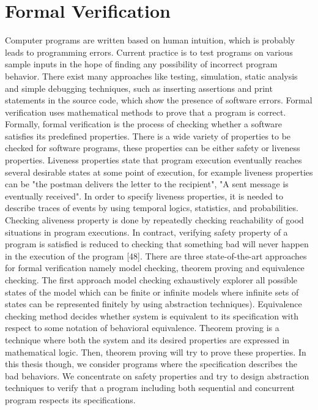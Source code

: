 \section*{Formal Verification} Computer programs are written based on human intuition, which is probably leads to programming errors. Current practice is to test programs on various sample inputs in the hope of finding any possibility of incorrect program behavior. There exist many approaches like testing, simulation, static analysis and simple debugging techniques, such as inserting assertions and print statements in the source code, which show the presence of software errors. Formal verification uses mathematical methods to prove that a program is correct. Formally, formal verification is the process of checking whether a software satisfies its predefined properties. There is a wide variety of properties to be checked for software programs, these properties can be either safety or liveness properties. Liveness properties state that program execution eventually reaches several desirable states at some point of execution, for example liveness properties can be "the postman delivers the letter to the recipient", "A sent message is eventually received". 
%
In order to specify liveness properties, it is needed to  describe traces of events by using temporal logics, statistics, and probabilities. Checking aliveness property is done by repeatedly checking reachability of good situations in program executions. In contract, verifying safety property of a program is satisfied is reduced to checking that something bad will never happen in the execution of the program [48]. There are three state-of-the-art approaches for formal verification namely model checking, theorem proving and equivalence checking. The first approach model checking exhaustively explorer all possible states of the model which can be finite or infinite models where infinite sets of states can be represented finitely by using abstraction techniques). Equivalence checking method decides whether system is equivalent to its specification with respect to some notation of behavioral equivalence. Theorem proving is a technique where both the system and its desired properties are expressed in mathematical logic. Then, theorem proving will try to prove these properties. In this thesis though, we consider programs where the specification describes the bad behaviors. We concentrate on safety properties and try to design abstraction techniques to verify that a program including both sequential and concurrent program respects its specifications. 

